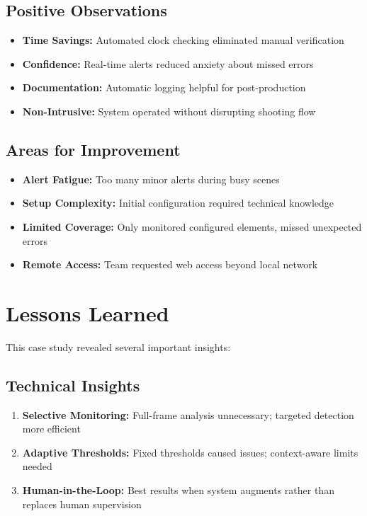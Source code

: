 \subsection{Positive Observations}
\label{subsec:positive}

\begin{itemize}
\item \textbf{Time Savings:} Automated clock checking eliminated manual verification
\item \textbf{Confidence:} Real-time alerts reduced anxiety about missed errors
\item \textbf{Documentation:} Automatic logging helpful for post-production
\item \textbf{Non-Intrusive:} System operated without disrupting shooting flow
\end{itemize}

\subsection{Areas for Improvement}
\label{subsec:improvements}

\begin{itemize}
\item \textbf{Alert Fatigue:} Too many minor alerts during busy scenes
\item \textbf{Setup Complexity:} Initial configuration required technical knowledge
\item \textbf{Limited Coverage:} Only monitored configured elements, missed unexpected errors
\item \textbf{Remote Access:} Team requested web access beyond local network
\end{itemize}

\section{Lessons Learned}
\label{sec:lessons}

This case study revealed several important insights:

\subsection{Technical Insights}
\label{subsec:tech-insights}

\begin{enumerate}
\item \textbf{Selective Monitoring:} Full-frame analysis unnecessary; targeted detection more efficient
\item \textbf{Adaptive Thresholds:} Fixed thresholds caused issues; context-aware limits needed
\item \textbf{Human-in-the-Loop:} Best results when system augments rather than replaces human supervision
\end{enumerate}

